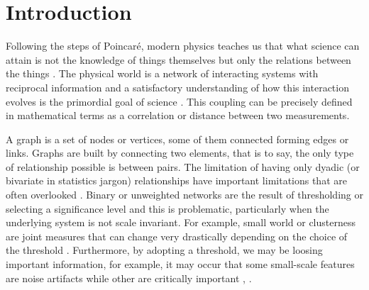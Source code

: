 \documentclass[onecollarge,runningheads]{svjour2}
\begin{document}
\section{Introduction}
Following the steps of Poincar{\'e}, modern physics teaches us that what science can attain is not the knowledge of things themselves but only the relations between the things \cite{Poincare:1952}. The physical world is a network of interacting systems with reciprocal information and a satisfactory understanding of how this interaction evolves is the primordial goal of science \cite{rovelli2015relative}.
This coupling can be precisely defined in mathematical terms as a correlation or distance between two measurements.

A graph is a set of nodes or vertices, some of them connected forming edges or links. Graphs are built by connecting two elements, that is to say, the only type of relationship possible is between pairs. The limitation of having only dyadic (or bivariate in statistics jargon) relationships have important limitations that are often overlooked \cite{giusti2016two}.
Binary or unweighted networks are the result of thresholding or selecting a significance level and this is problematic, particularly when the underlying system is not scale invariant. For example, small world or clusterness are joint measures that can change very drastically depending on the choice of the threshold \cite{toppi2012statistical}. Furthermore, by adopting a threshold, we may be loosing important information, for example, it may occur that some small-scale features are noise artifacts while other are critically important \cite{fallani2014graph}, \cite{papo2014complex}.
\end{document}
